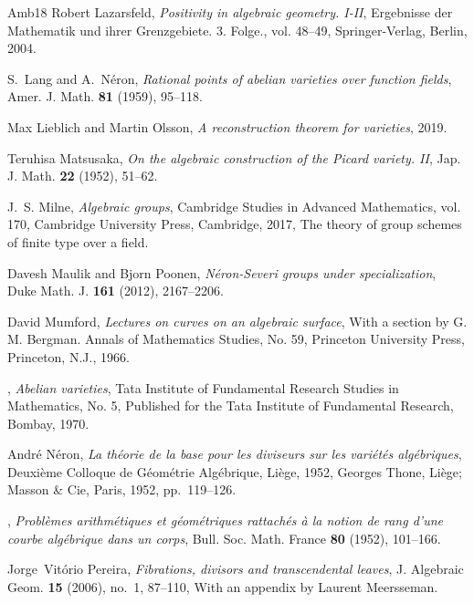\documentclass{amsart}
\theoremstyle{definition}
\theoremstyle{remark}
\begin{document}
\begin{thebibliography}{{Amb}18}
Robert Lazarsfeld, \emph{Positivity in algebraic geometry. {I}-{II}},
  Ergebnisse der Mathematik und ihrer Grenzgebiete. 3. Folge., vol. 48--49,
  Springer-Verlag, Berlin, 2004. 

S.~Lang and A.~N\'{e}ron, \emph{Rational points of abelian varieties over
  function fields}, Amer. J. Math. \textbf{81} (1959), 95--118. 

Max Lieblich and Martin Olsson, \emph{A reconstruction theorem for varieties},
  2019.

Teruhisa Matsusaka, \emph{On the algebraic construction of the {P}icard
  variety. {II}}, Jap. J. Math. \textbf{22} (1952), 51--62. 

J.~S. Milne, \emph{Algebraic groups}, Cambridge Studies in Advanced
  Mathematics, vol. 170, Cambridge University Press, Cambridge, 2017, The
  theory of group schemes of finite type over a field. 

Davesh Maulik and Bjorn Poonen, \emph{{N}{\'e}ron-{S}everi groups under
  specialization}, Duke Math. J. \textbf{161} (2012), 2167--2206.

David Mumford, \emph{Lectures on curves on an algebraic surface}, With a
  section by G. M. Bergman. Annals of Mathematics Studies, No. 59, Princeton
  University Press, Princeton, N.J., 1966. 

\bysame, \emph{Abelian varieties}, Tata Institute of Fundamental Research
  Studies in Mathematics, No. 5, Published for the Tata Institute of
  Fundamental Research, Bombay, 1970. 

Andr{\'e} N{\'e}ron, \emph{La th\'eorie de la base pour les diviseurs sur les
  vari\'et\'es alg\'ebriques}, Deuxi\`eme {C}olloque de {G}\'eom\'etrie
  {A}lg\'ebrique, {L}i\`ege, 1952, Georges Thone, Li\`ege; Masson \& Cie,
  Paris, 1952, pp.~119--126. 

\bysame, \emph{Probl\`emes arithm\'{e}tiques et g\'{e}om\'{e}triques
  rattach\'{e}s \`a la notion de rang d'une courbe alg\'{e}brique dans un
  corps}, Bull. Soc. Math. France \textbf{80} (1952), 101--166. 

Jorge~Vit\'{o}rio Pereira, \emph{Fibrations, divisors and transcendental
  leaves}, J. Algebraic Geom. \textbf{15} (2006), no.~1, 87--110, With an
  appendix by Laurent Meersseman. 


\end{thebibliography}
\end{document}
